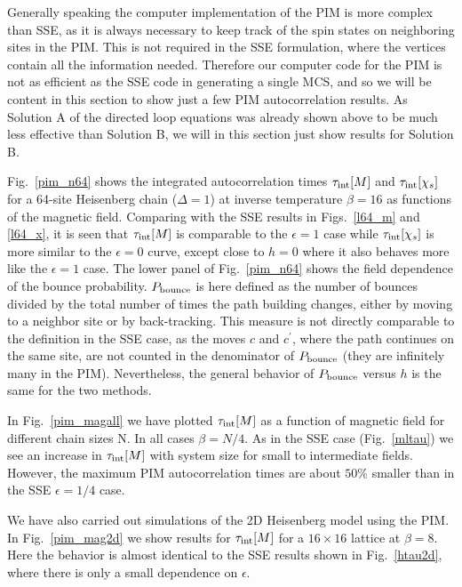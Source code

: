 \documentclass[10pt,pre,aps,twocolumn,showpacs,superscriptaddress,
floatfix]{revtex4}
\begin{document}
Generally speaking the computer implementation of the PIM is more complex 
than SSE, as it is always necessary to keep track of the spin states on 
neighboring sites in the PIM. This is not required in the SSE formulation,
where the vertices contain all the information needed. Therefore our computer 
code for the PIM is not as efficient as the SSE code in generating a single 
MCS, and so we will be content in this section to show just a few PIM 
autocorrelation results. As Solution A of the directed loop equations 
was already shown above to be much less effective than Solution B, we will 
in this section just show results for Solution B. 

Fig.~\ref{pim_n64} shows the integrated autocorrelation times 
$\tau_{\rm int}[M]$ and $\tau_{\rm int}[\chi_s]$ for a 64-site Heisenberg 
chain ($\Delta=1$) at inverse temperature $\beta=16$ as functions of 
the magnetic field. Comparing with the SSE results in Figs.~\ref{l64_m} 
and \ref{l64_x}, it is seen that $\tau_{\rm int}[M]$ is comparable to the 
$\epsilon=1$ case while $\tau_{\rm int}[\chi_s]$ is more similar to the 
$\epsilon=0$ curve, except close to $h=0$ where it also behaves more like 
the $\epsilon=1$ case. The lower panel of Fig.~\ref{pim_n64} shows the field 
dependence of the bounce probability. $P_{\rm bounce}$ is here defined as 
the number of bounces divided by the total number of times the path building 
changes, either by moving to a neighbor site or by back-tracking. This measure
is not directly comparable to the definition in the SSE case, as the moves 
$c$ and $c^\prime$, where the path continues on the same site, are not counted
in the denominator of $P_{\rm bounce}$ (they are infinitely many in the PIM). 
Nevertheless, the general behavior of $P_{\rm bounce}$ versus $h$ is the 
same for the two methods.   

In Fig.~\ref{pim_magall} we have plotted $\tau_{\rm int}[M]$ as a function of 
magnetic field for different chain sizes N. In all cases $\beta = N/4$. As 
in the SSE case (Fig.~\ref{mltau}) we see an increase in $\tau_{\rm int}[M]$ 
with system size for small to intermediate fields. However, the maximum PIM 
autocorrelation times are about $50\%$ smaller than in the SSE 
$\epsilon=1/4$ case. 

We have also carried out simulations of the 2D Heisenberg model using the 
PIM. In Fig.~\ref{pim_mag2d} we show results for $\tau_{\rm int}[M]$ for a 
$16\times 16$ lattice at $\beta=8$. Here the behavior is almost identical 
to the SSE results shown in Fig.~\ref{htau2d}, where there is only a small
dependence on $\epsilon$.
\end{document}
